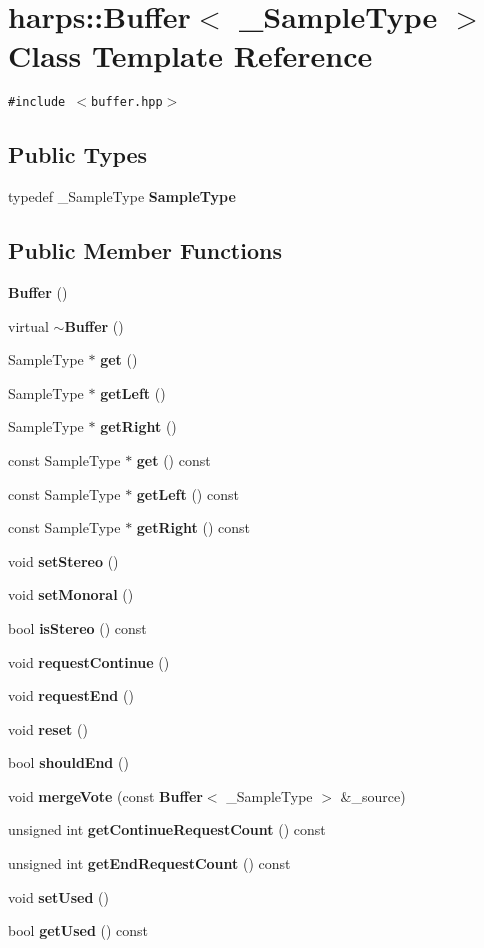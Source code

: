 \section{harps::Buffer$<$ \_\-SampleType $>$ Class Template Reference}
\label{classharps_1_1Buffer}
{\tt \#include $<$buffer.hpp$>$}

\subsection*{Public Types}
\begin{CompactItemize}
\item 
typedef \_\-SampleType \textbf{SampleType}\label{classharps_1_1Buffer_f7833b35eca516673a6673a2e3891de9}

\end{CompactItemize}
\subsection*{Public Member Functions}
\begin{CompactItemize}
\item 
{\bf Buffer} ()
\item 
virtual {\bf $\sim$Buffer} ()
\item 
SampleType $\ast$ {\bf get} ()
\item 
SampleType $\ast$ {\bf getLeft} ()
\item 
SampleType $\ast$ {\bf getRight} ()
\item 
const SampleType $\ast$ {\bf get} () const 
\item 
const SampleType $\ast$ {\bf getLeft} () const 
\item 
const SampleType $\ast$ {\bf getRight} () const 
\item 
void {\bf setStereo} ()
\item 
void {\bf setMonoral} ()
\item 
bool {\bf isStereo} () const 
\item 
void {\bf requestContinue} ()
\item 
void {\bf requestEnd} ()
\item 
void {\bf reset} ()
\item 
bool {\bf shouldEnd} ()
\item 
void {\bf mergeVote} (const {\bf Buffer}$<$ \_\-SampleType $>$ \&\_\-source)
\item 
unsigned int {\bf getContinueRequestCount} () const 
\item 
unsigned int {\bf getEndRequestCount} () const 
\item 
void {\bf setUsed} ()
\item 
bool {\bf getUsed} () const 
\end{CompactItemize}


